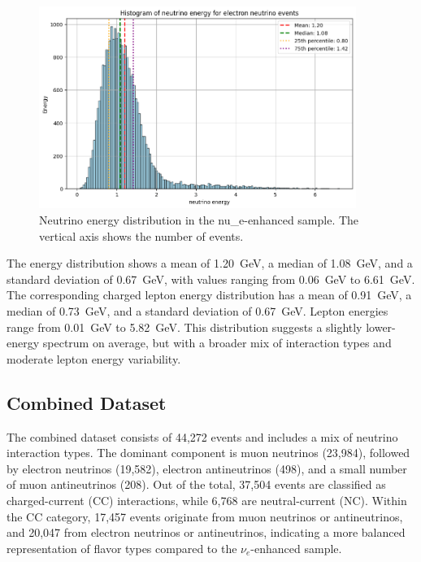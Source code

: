 \documentclass{pracalicmgr}
\begin{document}
\begin{figure}[H]
    \centering
    \includegraphics[width=0.92\textwidth]{src/neutrinoElectron.png}
    \caption{Neutrino energy distribution in the nu\_e-enhanced sample. The vertical axis shows the number of events.}
    \label{fig:neutrino-nue}
\end{figure}


The energy distribution shows a mean of 1.20~GeV, a median of 1.08~GeV, and a standard deviation of 0.67~GeV, with values ranging from 0.06~GeV to 6.61~GeV. The corresponding charged lepton energy distribution has a mean of 0.91~GeV, a median of 0.73~GeV, and a standard deviation of 0.67~GeV. Lepton energies range from 0.01~GeV to 5.82~GeV. This distribution suggests a slightly lower-energy spectrum on average, but with a broader mix of interaction types and moderate lepton energy variability.

\subsection{Combined Dataset}

The combined dataset consists of 44,272 events and includes a mix of neutrino interaction types. The dominant component is muon neutrinos (23,984), followed by electron neutrinos (19,582), electron antineutrinos (498), and a small number of muon antineutrinos (208). Out of the total, 37,504 events are classified as charged-current (CC) interactions, while 6,768 are neutral-current (NC). Within the CC category, 17,457 events originate from muon neutrinos or antineutrinos, and 20,047 from electron neutrinos or antineutrinos, indicating a more balanced representation of flavor types compared to the $\nu_e$-enhanced sample. 
\end{document}
